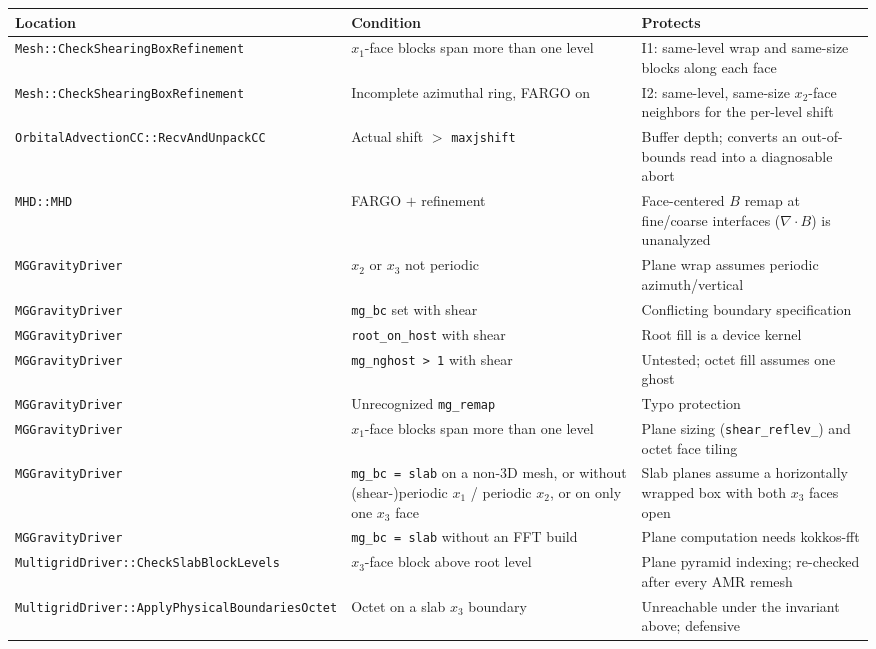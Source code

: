 \documentclass[11pt]{article}
\newcommand{\code}[1]{\texttt{#1}}
\newcommand{\fn}[1]{\texttt{\small #1}}
\begin{document}
\begin{center}
\small
\begin{longtable}{@{}>{\raggedright\arraybackslash}p{4.6cm}>{\raggedright\arraybackslash}p{3.6cm}p{5.6cm}@{}}
\toprule
Location & Condition & Protects \\
\midrule
\endhead
\fn{Mesh::CheckShearingBox\-Refinement} & $x_1$-face blocks span more than one level &
I1: same-level wrap and same-size blocks along each face \\
\fn{Mesh::CheckShearingBox\-Refinement} & Incomplete azimuthal ring, FARGO on &
I2: same-level, same-size $x_2$-face neighbors for the per-level shift \\
\fn{OrbitalAdvectionCC::\-RecvAndUnpackCC} & Actual shift $>$ \code{maxjshift} &
Buffer depth; converts an out-of-bounds read into a diagnosable abort \\
\fn{MHD::MHD} & FARGO $+$ refinement & Face-centered $B$ remap at fine/coarse
interfaces ($\nabla\!\cdot\!B$) is unanalyzed \\
\fn{MGGravityDriver} & $x_2$ or $x_3$ not periodic & Plane wrap assumes periodic
azimuth/vertical \\
\fn{MGGravityDriver} & \code{mg\_bc} set with shear & Conflicting boundary
specification \\
\fn{MGGravityDriver} & \code{root\_on\_host} with shear & Root fill is a device kernel \\
\fn{MGGravityDriver} & \code{mg\_nghost > 1} with shear & Untested; octet fill assumes
one ghost \\
\fn{MGGravityDriver} & Unrecognized \code{mg\_remap} & Typo protection \\
\fn{MGGravityDriver} & $x_1$-face blocks span more than one level & Plane sizing
(\code{shear\_reflev\_}) and octet face tiling \\
\fn{MGGravityDriver} & \code{mg\_bc\,=\,slab} on a non-3D mesh, or without
(shear-)periodic $x_1$ / periodic $x_2$, or on only one $x_3$ face & Slab planes
assume a horizontally wrapped box with both $x_3$ faces open \\
\fn{MGGravityDriver} & \code{mg\_bc\,=\,slab} without an FFT build & Plane
computation needs kokkos-fft \\
\fn{MultigridDriver::Check\-SlabBlockLevels} & $x_3$-face block above root level &
Plane pyramid indexing; re-checked after every AMR remesh \\
\fn{MultigridDriver::Apply\-PhysicalBoundariesOctet} & Octet on a slab $x_3$
boundary & Unreachable under the invariant above; defensive \\
\bottomrule
\end{longtable}
\end{center}
\end{document}
